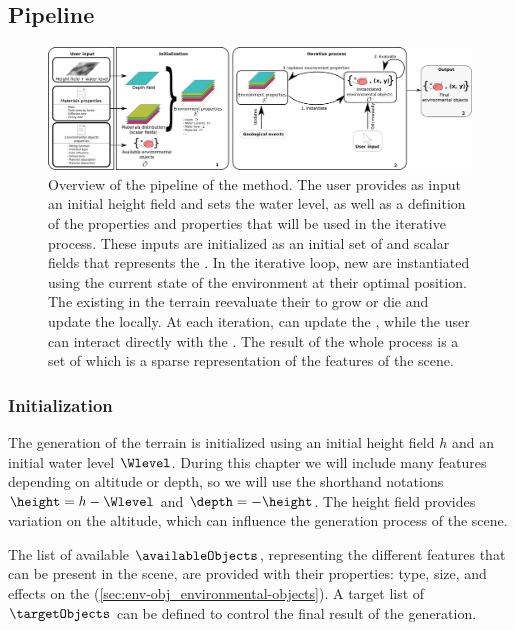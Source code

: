 \subsection{Pipeline}

\begin{figure}[H]
    \includegraphics{pipeline.pdf}
    \caption{Overview of the pipeline of the method. The user provides as input an initial height field and sets the water level, as well as a definition of the  properties and  properties that will be used in the iterative process. These inputs are initialized as an initial set of  and scalar fields that represents the . In the iterative loop, new  are instantiated using the current state of the environment at their optimal position. The existing  in the terrain reevaluate their  to grow or die and update the  locally. At each iteration,  can update the , while the user can interact directly with the . The result of the whole process is a set of  which is a sparse representation of the features of the scene. }
    \label{fig:env-obj_pipeline}
\end{figure}

\subsubsection{Initialization}

The generation of the terrain is initialized using an initial height field $h$ and an initial water level $\Wlevel$. 
During this chapter we will include many features depending on altitude or depth, so we will use the shorthand notations $\height = h - \Wlevel$ and $\depth = -\height$. The height field provides variation on the altitude, which can influence the generation process of the scene.

The list of available  $\availableObjects$, representing the different features that can be present in the scene, are provided with their properties: type, size,  and effects on the  (\cref{sec:env-obj_environmental-objects}). A target list of  $\targetObjects$ can be defined to control the final result of the generation.

